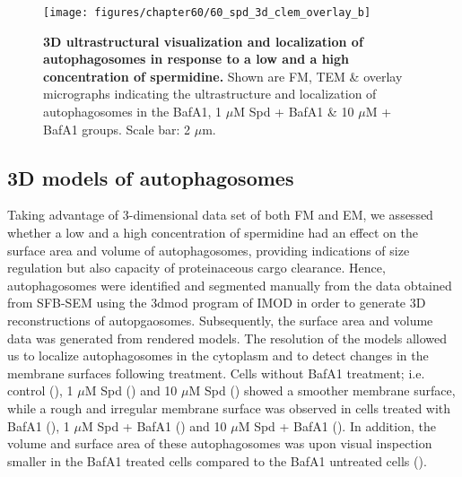 \begin{landscape}
\begin{figure}[!htbp]
\vspace{1.2cm}
\center
 \texttt{[image: figures/chapter60/60\_spd\_3d\_clem\_overlay\_b]}
 \caption[3D ultrastructural visualization and localization of autophagosomes in response to a low and a high concentration of spermidine]{\textbf{3D ultrastructural visualization and localization of autophagosomes in response to a low and a high concentration of spermidine.} Shown are FM, TEM \& overlay micrographs indicating the ultrastructure and localization of autophagosomes in the BafA1, 1 $\mu$M Spd + BafA1 \& 10 $\mu$M + BafA1 groups. Scale bar: 2 $\mu$m.}
 \label{fig:60_spd_3d_clem_overlay_b}
\end{figure} 
\end{landscape}

\subsection{3D models of autophagosomes}
Taking advantage of 3-dimensional data set of both FM and EM, we assessed whether a low and a high concentration of spermidine had an effect on the surface area and volume of autophagosomes, providing indications of size regulation but also capacity of proteinaceous cargo clearance. Hence, autophagosomes were identified and segmented manually from the data obtained from SFB-SEM using the 3dmod program of IMOD \citep{Kremer1996} in order to generate 3D reconstructions of autopgaosomes. Subsequently, the surface area and volume data was generated from rendered models. The resolution of the models allowed us to localize autophagosomes in the cytoplasm and to detect changes in the membrane surfaces following treatment. Cells without BafA1 treatment; i.e. control (), 1 $\mu$M Spd () and 10 $\mu$M Spd () showed a smoother membrane surface, while a rough and irregular membrane surface was observed in cells treated with BafA1 (), 1 $\mu$M Spd + BafA1 () and 10 $\mu$M Spd + BafA1 (). In addition, the volume and surface area of these autophagosomes was upon visual inspection smaller in the BafA1 treated cells compared to the BafA1 untreated cells ().

